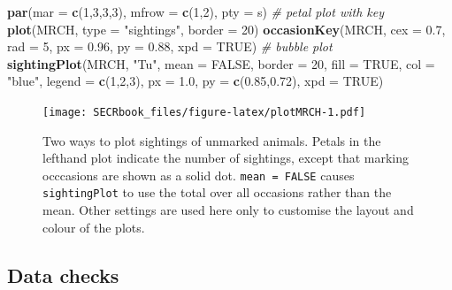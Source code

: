 \documentclass[
]{book}
\newenvironment{Shaded}{\begin{snugshade}}{\end{snugshade}}
\newcommand{\AttributeTok}[1]{\textcolor[rgb]{0.13,0.29,0.53}{#1}}
\newcommand{\CommentTok}[1]{\textcolor[rgb]{0.56,0.35,0.01}{\textit{#1}}}
\newcommand{\ConstantTok}[1]{\textcolor[rgb]{0.56,0.35,0.01}{#1}}
\newcommand{\DecValTok}[1]{\textcolor[rgb]{0.00,0.00,0.81}{#1}}
\newcommand{\FloatTok}[1]{\textcolor[rgb]{0.00,0.00,0.81}{#1}}
\newcommand{\FunctionTok}[1]{\textcolor[rgb]{0.13,0.29,0.53}{\textbf{#1}}}
\newcommand{\NormalTok}[1]{#1}
\newcommand{\StringTok}[1]{\textcolor[rgb]{0.31,0.60,0.02}{#1}}
\begin{document}
\begin{Shaded}
\begin{Highlighting}[]
\FunctionTok{par}\NormalTok{(}\AttributeTok{mar =} \FunctionTok{c}\NormalTok{(}\DecValTok{1}\NormalTok{,}\DecValTok{3}\NormalTok{,}\DecValTok{3}\NormalTok{,}\DecValTok{3}\NormalTok{), }\AttributeTok{mfrow =} \FunctionTok{c}\NormalTok{(}\DecValTok{1}\NormalTok{,}\DecValTok{2}\NormalTok{), }\AttributeTok{pty =} \StringTok{\textquotesingle{}s\textquotesingle{}}\NormalTok{)}
\CommentTok{\# petal plot with key}
\FunctionTok{plot}\NormalTok{(MRCH, }\AttributeTok{type =} \StringTok{"sightings"}\NormalTok{, }\AttributeTok{border =} \DecValTok{20}\NormalTok{)}
\FunctionTok{occasionKey}\NormalTok{(MRCH, }\AttributeTok{cex =} \FloatTok{0.7}\NormalTok{, }\AttributeTok{rad =} \DecValTok{5}\NormalTok{, }\AttributeTok{px =} \FloatTok{0.96}\NormalTok{, }\AttributeTok{py =} \FloatTok{0.88}\NormalTok{, }\AttributeTok{xpd =} \ConstantTok{TRUE}\NormalTok{)}
\CommentTok{\# bubble plot}
\FunctionTok{sightingPlot}\NormalTok{(MRCH, }\StringTok{"Tu"}\NormalTok{, }\AttributeTok{mean =} \ConstantTok{FALSE}\NormalTok{, }\AttributeTok{border =} \DecValTok{20}\NormalTok{, }\AttributeTok{fill =} \ConstantTok{TRUE}\NormalTok{, }\AttributeTok{col =} \StringTok{"blue"}\NormalTok{, }
             \AttributeTok{legend =} \FunctionTok{c}\NormalTok{(}\DecValTok{1}\NormalTok{,}\DecValTok{2}\NormalTok{,}\DecValTok{3}\NormalTok{), }\AttributeTok{px =} \FloatTok{1.0}\NormalTok{, }\AttributeTok{py =} \FunctionTok{c}\NormalTok{(}\FloatTok{0.85}\NormalTok{,}\FloatTok{0.72}\NormalTok{), }\AttributeTok{xpd =} \ConstantTok{TRUE}\NormalTok{)}
\end{Highlighting}
\end{Shaded}

\begin{figure}
\centering
\texttt{[image: SECRbook\_files/figure-latex/plotMRCH-1.pdf]}
\caption{\label{fig:plotMRCH}Two ways to plot sightings of unmarked animals. Petals in the lefthand plot indicate the number of sightings, except that marking occcasions are shown as a solid dot. \texttt{mean\ =\ FALSE} causes \texttt{sightingPlot} to use the total over all occasions rather than the mean. Other settings are used here only to customise the layout and colour of the plots.}
\end{figure}

\subsection{Data checks}\label{data-checks}
\end{document}
